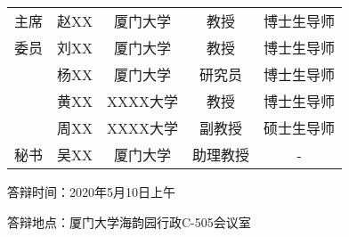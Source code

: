 
\begin{namelist}
\begin{center}
 \begin{tabularx}{\textwidth}{@{\extracolsep{\fill}}ccccc} 
    主席 & 赵XX & 厦门大学 & 教授 & 博士生导师\\ 
    委员 & 刘XX & 厦门大学 & 教授 & 博士生导师\\ 
        & 杨XX & 厦门大学 & 研究员 & 博士生导师\\ 
        & 黄XX & XXXX大学 & 教授 & 博士生导师\\ 
        & 周XX & XXXX大学 & 副教授 & 硕士生导师\\ 
    秘书 & 吴XX & 厦门大学 & 助理教授 & -\\ 
\end{tabularx}
\end{center}
\vspace{1cm}

\noindent 答辩时间：2020年5月10日上午

\noindent 答辩地点：厦门大学海韵园行政C-505会议室


\end{namelist}
